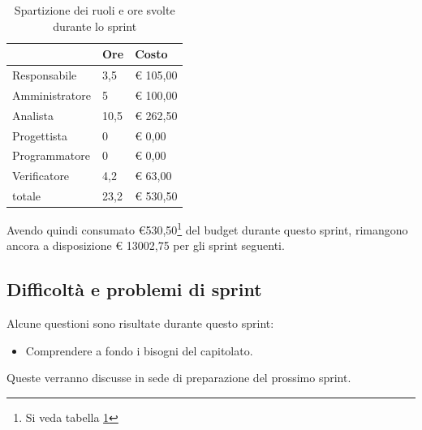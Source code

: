 \begin{table}[ht]
    \begin{tabularx}{\linewidth}{X|l|l}
    \rowcolor{gray!30}& Ore & Costo \\
    \hline
    
    Responsabile & 3,5 & € 105,00 \\
    \rowcolor{gray!10}Amministratore & 5 & € 100,00 \\
    Analista & 10,5 & € 262,50 \\
    \rowcolor{gray!10}Progettista & 0 & € 0,00 \\
    Programmatore & 0 & € 0,00 \\
    \rowcolor{gray!10}Verificatore & 4,2 &€ 63,00 \\
    totale & 23,2 & € 530,50 \\
    \end{tabularx}
    \caption{\label{costi-ruolo}Spartizione dei ruoli e ore svolte durante lo sprint}
\end{table}


Avendo quindi consumato €530,50\footnote{Si veda tabella \ref{costi-ruolo}} del budget durante questo sprint, rimangono ancora a disposizione € 13002,75 per gli sprint seguenti.

\subsection{Difficoltà e problemi di sprint}

Alcune questioni sono risultate durante questo sprint:

\begin{itemize}
    \item Comprendere a fondo i bisogni del capitolato.
\end{itemize}

Queste verranno discusse in sede di preparazione del prossimo sprint.
